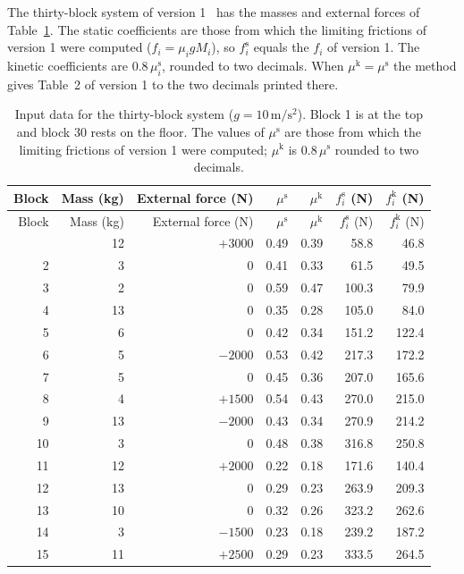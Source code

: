 \documentclass[11pt,a4paper]{article}
\newcommand{\fs}{f^{\mathrm{s}}}
\newcommand{\mus}{\mu^{\mathrm{s}}}
\newcommand{\muk}{\mu^{\mathrm{k}}}
\begin{document}
The thirty-block system of version 1~\cite{singh1} has the masses and external forces of Table~\ref{tab:input30}. The static coefficients are those from which the limiting frictions of version 1 were computed ($f_i=\mu_i gM_i$), so $\fs_i$ equals the $f_i$ of version 1. The kinetic coefficients are $0.8\,\mus_i$, rounded to two decimals. When $\muk=\mus$ the method gives Table~2 of version 1 to the two decimals printed there.

\begin{longtable}{@{}rrrrrrr@{}}
\caption{Input data for the thirty-block system ($g=10\,\mathrm{m/s^2}$). Block 1 is at the top and block 30 rests on the floor. The values of $\mu^{\mathrm s}$ are those from which the limiting frictions of version 1 were computed; $\mu^{\mathrm k}$ is $0.8\,\mu^{\mathrm s}$ rounded to two decimals.}\label{tab:input30}\\
\toprule
Block & Mass (kg) & External force (N) & $\mu^{\mathrm s}$ & $\mu^{\mathrm k}$ & $f^{\mathrm s}_i$ (N) & $f^{\mathrm k}_i$ (N)\\
\midrule
\endfirsthead
\toprule
Block & Mass (kg) & External force (N) & $\mu^{\mathrm s}$ & $\mu^{\mathrm k}$ & $f^{\mathrm s}_i$ (N) & $f^{\mathrm k}_i$ (N)\\
\midrule
\endhead
\bottomrule
\endlastfoot
1 & 12 & $+3000$ & 0.49 & 0.39 & 58.8 & 46.8 \\
2 & 3 & 0 & 0.41 & 0.33 & 61.5 & 49.5 \\
3 & 2 & 0 & 0.59 & 0.47 & 100.3 & 79.9 \\
4 & 13 & 0 & 0.35 & 0.28 & 105.0 & 84.0 \\
5 & 6 & 0 & 0.42 & 0.34 & 151.2 & 122.4 \\
6 & 5 & $-2000$ & 0.53 & 0.42 & 217.3 & 172.2 \\
7 & 5 & 0 & 0.45 & 0.36 & 207.0 & 165.6 \\
8 & 4 & $+1500$ & 0.54 & 0.43 & 270.0 & 215.0 \\
9 & 13 & $-2000$ & 0.43 & 0.34 & 270.9 & 214.2 \\
10 & 3 & 0 & 0.48 & 0.38 & 316.8 & 250.8 \\
11 & 12 & $+2000$ & 0.22 & 0.18 & 171.6 & 140.4 \\
12 & 13 & 0 & 0.29 & 0.23 & 263.9 & 209.3 \\
13 & 10 & 0 & 0.32 & 0.26 & 323.2 & 262.6 \\
14 & 3 & $-1500$ & 0.23 & 0.18 & 239.2 & 187.2 \\
15 & 11 & $+2500$ & 0.29 & 0.23 & 333.5 & 264.5 \\

\end{longtable}
\end{document}
